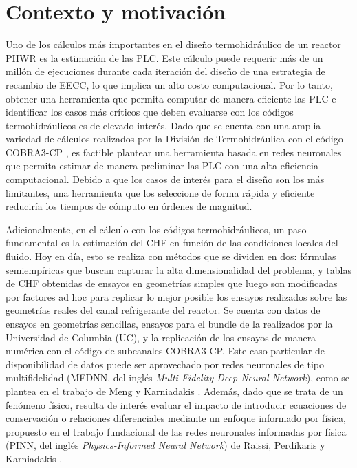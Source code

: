 \section{Contexto y motivación}
Uno de los cálculos más importantes en el diseño termohidráulico de un reactor PHWR es la estimación de las PLC. Este cálculo puede requerir más de un millón de ejecuciones durante cada iteración del diseño de una estrategia de recambio de EECC, lo que implica un alto costo computacional. Por lo tanto, obtener una herramienta que permita computar de manera eficiente las PLC e identificar los casos más críticos que deben evaluarse con los códigos termohidráulicos es de elevado interés. Dado que se cuenta con una amplia variedad de cálculos realizados por la División de Termohidráulica con el código COBRA3-CP \citep{cobra3cp}, es factible plantear una herramienta basada en redes neuronales que permita estimar de manera preliminar las PLC con una alta eficiencia computacional. Debido a que los casos de interés para el diseño son los más limitantes, una herramienta que los seleccione de forma rápida y eficiente reduciría los tiempos de cómputo en órdenes de magnitud.

Adicionalmente, en el cálculo con los códigos termohidráulicos, un paso fundamental es la estimación del CHF en función de las condiciones locales del fluido. Hoy en día, esto se realiza con métodos que se dividen en dos: fórmulas semiempíricas que buscan capturar la alta dimensionalidad del problema, y tablas de CHF obtenidas de ensayos en geometrías simples que luego son modificadas por factores ad hoc para replicar lo mejor posible los ensayos realizados sobre las geometrías reales del canal refrigerante del reactor. Se cuenta con datos de ensayos en geometrías sencillas, ensayos para el bundle de la \cna{} realizados por la Universidad de Columbia (UC), y la replicación de los ensayos de manera numérica con el código de subcanales COBRA3-CP. Este caso particular de disponibilidad de datos puede ser aprovechado por redes neuronales de tipo multifidelidad (MFDNN, del inglés \textit{Multi-Fidelity Deep Neural Network}), como se plantea en el trabajo de Meng y Karniadakis \citep{MENG2020}. Además, dado que se trata de un fenómeno físico, resulta de interés evaluar el impacto de introducir ecuaciones de conservación o relaciones diferenciales mediante un enfoque informado por física, propuesto en el trabajo fundacional de las redes neuronales informadas por física (PINN, del inglés \textit{Physics-Informed Neural Network}) de Raissi, Perdikaris y Karniadakis \citep{RAISSI2019}.

